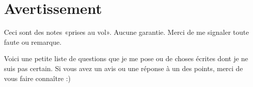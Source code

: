 
\section{Avertissement}

Ceci sont des notes «prises au vol». Aucune garantie. Merci de me signaler toute faute ou remarque. 

Voici une petite liste de questions que je me pose ou de choses écrites dont je ne suis pas certain. Si vous avez un avis ou une réponse à un des points, merci de vous faire connaître :)
